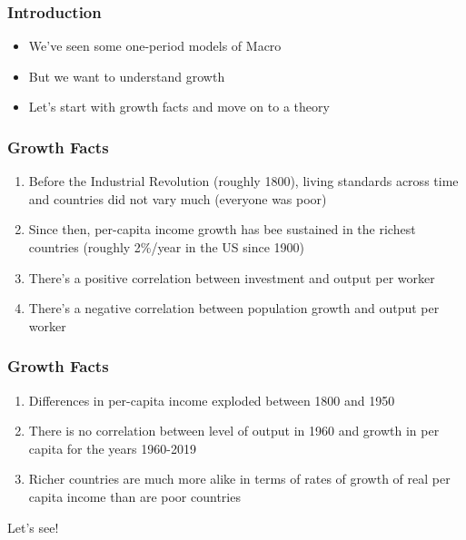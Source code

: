 \documentclass{beamer}
\author{Trevor S. Gallen}
\date{}
\begin{document}
\renewcommand*{\inserttotalframenumber}{\pageref{lastframe}}



\begin{frame}
\titlepage
\end{frame}

\begin{frame}
\frametitle[alignment=center]{Introduction}
\begin{itemize}
\item We've seen some one-period models of Macro
\bigskip
\item But we want to understand growth  
\bigskip
\item Let's start with growth facts and move on to a theory
\end{itemize}
\end{frame}

\begin{frame}
\frametitle[alignment=center]{Growth Facts}
\begin{enumerate}
\item Before the Industrial Revolution (roughly 1800), living standards across time and countries did not vary much (everyone was poor)
\bigskip
\item Since then, per-capita income growth has bee sustained in the richest countries (roughly 2\%/year in the US since 1900)
\bigskip
\item There's a positive correlation between investment and output per worker
\bigskip
\item There's a negative correlation between population growth and output per worker
\end{enumerate}
\end{frame}

\begin{frame}
\frametitle[alignment=center]{Growth Facts}
\begin{enumerate}\addtocounter{enumi}{4}
\item Differences in per-capita income exploded between 1800 and 1950
\bigskip
\item There is no correlation between level of output in 1960 and growth in per capita for the years 1960-2019
\bigskip
\item Richer countries are much more alike in terms of rates of growth of real per capita income than are poor countries
\end{enumerate}
Let's see!
\end{frame}
\end{document}
